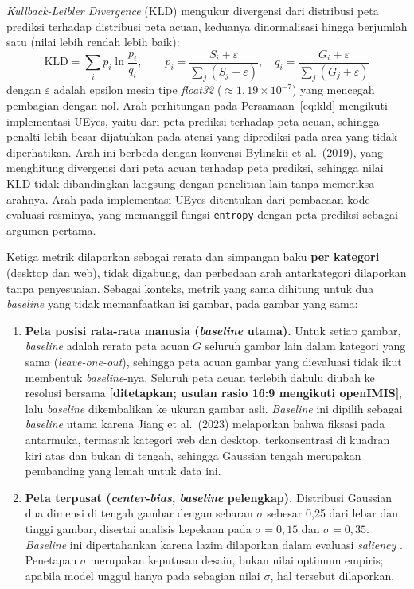 \emph{Kullback-Leibler Divergence} (KLD) mengukur divergensi dari distribusi peta prediksi terhadap distribusi peta acuan, keduanya dinormalisasi hingga berjumlah satu (nilai lebih rendah lebih baik):
\begin{equation}
  \mathrm{KLD} = \sum_i p_i \ln\frac{p_i}{q_i},\qquad p_i=\frac{S_i+\varepsilon}{\sum_j (S_j+\varepsilon)},\quad q_i=\frac{G_i+\varepsilon}{\sum_j (G_j+\varepsilon)}
  \label{eq:kld}
\end{equation}
dengan $\varepsilon$ adalah epsilon mesin tipe \emph{float32} ($\approx 1{,}19\times10^{-7}$) yang mencegah pembagian dengan nol. Arah perhitungan pada Persamaan~\eqref{eq:kld} mengikuti implementasi UEyes, yaitu dari peta prediksi terhadap peta acuan, sehingga penalti lebih besar dijatuhkan pada atensi yang diprediksi pada area yang tidak diperhatikan. Arah ini berbeda dengan konvensi Bylinskii et al.\ (2019), yang menghitung divergensi dari peta acuan terhadap peta prediksi, sehingga nilai KLD tidak dibandingkan langsung dengan penelitian lain tanpa memeriksa arahnya. Arah pada implementasi UEyes ditentukan dari pembacaan kode evaluasi resminya, yang memanggil fungsi \texttt{entropy} dengan peta prediksi sebagai argumen pertama.

Ketiga metrik dilaporkan sebagai rerata dan simpangan baku \textbf{per kategori} (desktop dan web), tidak digabung, dan perbedaan arah antarkategori dilaporkan tanpa penyesuaian. Sebagai konteks, metrik yang sama dihitung untuk dua \emph{baseline} yang tidak memanfaatkan isi gambar, pada gambar yang sama:
\begin{enumerate}
  \item \textbf{Peta posisi rata-rata manusia (\emph{baseline} utama).} Untuk setiap gambar, \emph{baseline} adalah rerata peta acuan $G$ seluruh gambar lain dalam kategori yang sama (\emph{leave-one-out}), sehingga peta acuan gambar yang dievaluasi tidak ikut membentuk \emph{baseline}-nya. Seluruh peta acuan terlebih dahulu diubah ke resolusi bersama \textbf{[ditetapkan; usulan rasio 16:9 mengikuti openIMIS]}, lalu \emph{baseline} dikembalikan ke ukuran gambar asli. \emph{Baseline} ini dipilih sebagai \emph{baseline} utama karena Jiang et al.\ (2023) melaporkan bahwa fiksasi pada antarmuka, termasuk kategori web dan desktop, terkonsentrasi di kuadran kiri atas dan bukan di tengah, sehingga Gaussian tengah merupakan pembanding yang lemah untuk data ini.
  \item \textbf{Peta terpusat (\emph{center-bias}, \emph{baseline} pelengkap).} Distribusi Gaussian dua dimensi di tengah gambar dengan sebaran $\sigma$ sebesar 0,25 dari lebar dan tinggi gambar, disertai analisis kepekaan pada $\sigma = 0{,}15$ dan $\sigma = 0{,}35$. \emph{Baseline} ini dipertahankan karena lazim dilaporkan dalam evaluasi \emph{saliency} \citep{bylinskii2019what}. Penetapan $\sigma$ merupakan keputusan desain, bukan nilai optimum empiris; apabila model unggul hanya pada sebagian nilai $\sigma$, hal tersebut dilaporkan.
\end{enumerate}

